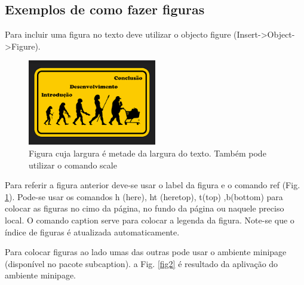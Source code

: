 \subsection{Exemplos de como fazer figuras}
Para incluir uma figura no texto deve utilizar o objecto figure (Insert->Object->Figure).
\begin{figure}[ht]
  \centering
  \includegraphics[width=0.5\textwidth]{images/figura1.png}
  \caption{Figura cuja largura é metade da largura do texto. Também pode utilizar o comando scale}\label{fig1}
\end{figure}
Para referir a figura anterior deve-se usar o label da figura e o comando ref (Fig. \ref{fig1}). Pode-se usar os comandos h (here), ht (heretop), t(top) ,b(bottom) para colocar as figuras no cimo da página, no fundo da página ou naquele preciso local. O comando caption serve para colocar a legenda da figura. Note-se que o índice de figuras é atualizada automaticamente.

Para colocar figuras ao lado umas das outras pode usar o ambiente minipage (disponível no pacote subcaption). a Fig. \ref{fig2} é resultado da aplivação do ambiente minipage.

